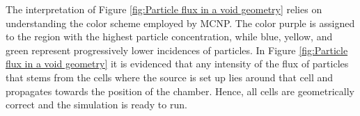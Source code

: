The interpretation of Figure \ref{fig:Particle flux in a void geometry} relies on understanding the color scheme employed by MCNP. The color purple is assigned to the region with the highest particle concentration, while blue, yellow, and green represent progressively lower incidences of particles. In Figure \ref{fig:Particle flux in a void geometry} it is evidenced that any intensity of the flux of particles that stems from the cells where the source is set up lies around that cell and propagates towards the position of the chamber. Hence, all cells are geometrically correct and the simulation is ready to run.